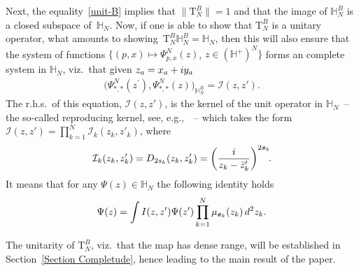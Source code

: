 \documentclass[11pt]{article}
\numberwithin{equation}{section}
\numberwithin{equation}{section}
\begin{document}
Next, the equality~\eqref{unit-B} implies that $\|\mathrm T_{N}^{B}\|=1$ and that the image of $\mathbb H_{N}^{B}$ is a closed subspace of~$\mathbb H_N$. Now, if one is able to show that $\mathrm T_{N}^{B}$ is a unitary operator, what amounts to sho\-wing~$\mathrm T_{N}^{B}\mathbb H_{N}^{B}=\mathbb H_N$, then this will also ensure that the system of functions $\big\{(p,x)\mapsto \Psi^{N}_{p,{x}}(z)$, $z\in (\mathbb{H}^+)^{N}\big\}$ forms an complete system in $\mathbb H_N$, viz.~that given $z_a=x_a+{\rm i}y_a$
\begin{gather*}
\big(\Psi^N_{*,*}(z^{\prime} ), \Psi^N_{*,*}(z)\big)_{ \mathbb{H}_N^{B} } = \mathcal{I}(z,z').
\end{gather*}
The r.h.s.\ of this equation, $\mathcal I(z,z')$, is the kernel of the unit operator in $\mathbb H_N$~-- the so-called reproducing kernel,
see, e.g.,~\cite{HallBrian}~-- which takes the form $\mathcal I(z,z')=\prod_{k=1}^N \mathcal I_k(z_k,z'_k)$, where
\begin{gather*}
\mathcal I_k(z_k,z'_k)=D_{2s_k}(z_k,z'_k)=\bigg(\frac{\rm i}{z_k-\bar z'_k}\bigg)^{2\boldsymbol s_k}\!.
\end{gather*}
It means that for any $\Psi(z)\in \mathbb H_N$ the following identity holds
\begin{gather*}
\Psi(z)=\int I(z,z')\Psi(z')\prod_{k=1}^N \mu_{\boldsymbol s_k}(z_k)\,{\rm d}^2z_k.
\end{gather*}

The unitarity of $\mathrm T_{N}^{B}$, viz.~that the map has dense range, will be established in Section~\ref{Section Completude},
hence leading to the main result of the paper.
\end{document}
